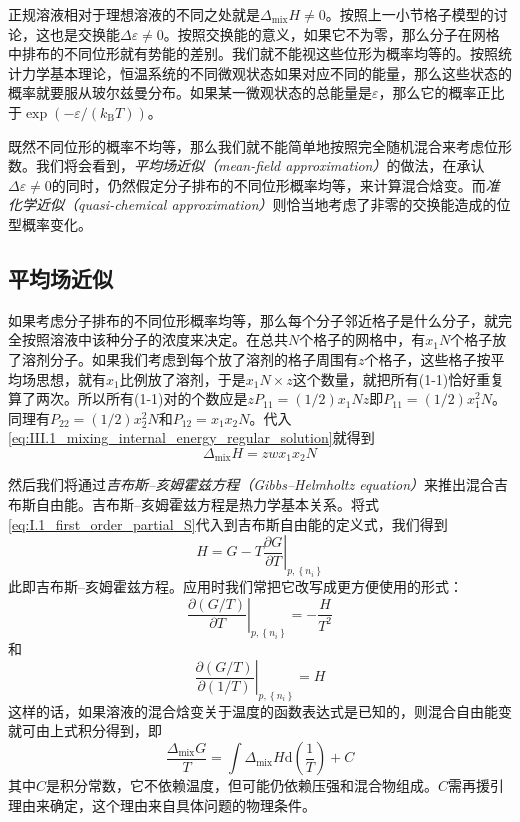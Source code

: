 \documentclass[main.tex]{subfiles}
\begin{document}
正规溶液相对于理想溶液的不同之处就是$\Delta_\text{mix}H\neq 0$。按照上一小节格子模型的讨论，这也是交换能$\Delta\varepsilon\neq 0$。按照交换能的意义，如果它不为零，那么分子在网格中排布的不同位形就有势能的差别。我们就不能视这些位形为概率均等的。按照统计力学基本理论，恒温系统的不同微观状态如果对应不同的能量，那么这些状态的概率就要服从玻尔兹曼分布。如果某一微观状态的总能量是$\varepsilon$，那么它的概率正比于$\exp\left(-\varepsilon/\left(k_\text{B}T\right)\right)$。

既然不同位形的概率不均等，那么我们就不能简单地按照完全随机混合来考虑位形数。我们将会看到，\emph{平均场近似（mean-field approximation）}的做法，在承认$\Delta\varepsilon\neq 0$的同时，仍然假定分子排布的不同位形概率均等，来计算混合焓变。而\emph{准化学近似（quasi-chemical approximation）}则恰当地考虑了非零的交换能造成的位型概率变化。

\subsection{平均场近似}
如果考虑分子排布的不同位形概率均等，那么每个分子邻近格子是什么分子，就完全按照溶液中该种分子的浓度来决定。在总共$N$个格子的网格中，有$x_1N$个格子放了溶剂分子。如果我们考虑到每个放了溶剂的格子周围有$z$个格子，这些格子按平均场思想，就有$x_1$比例放了溶剂，于是$x_1 N\times z$这个数量，就把所有(1-1)恰好重复算了两次。所以所有(1-1)对的个数应是$zP_{11}=(1/2)x_1Nz$即$P_{11}=(1/2)x_1^2N$。同理有$P_{22}=(1/2)x_2^2N$和$P_{12}=x_1x_2N$。代入\eqref{eq:III.1_mixing_internal_energy_regular_solution}就得到
\begin{equation}\label{eq:III.2_mixing_internal_energy_regular_solution_mean_field}
  \Delta_\text{mix}H=zwx_1x_2N
\end{equation}

然后我们将通过\emph{吉布斯--亥姆霍兹方程（Gibbs--Helmholtz equation）}来推出混合吉布斯自由能。吉布斯--亥姆霍兹方程是热力学基本关系。将式\eqref{eq:I.1_first_order_partial_S}代入到吉布斯自由能的定义式，我们得到
\begin{equation}\label{eq:III.2_gibbs_helmholtz_eq}
  H=G-T\left.\frac{\partial G}{\partial T}\right|_{p,\left\{n_i\right\}}
\end{equation}
此即吉布斯--亥姆霍兹方程。应用时我们常把它改写成更方便使用的形式：
\[
  \left.\frac{\partial\left(G/T\right)}{\partial T}\right|_{p,\left\{n_i\right\}}=-\frac{H}{T^2}
\]
和
\[\left.\frac{\partial\left(G/T\right)}{\partial\left(1/T\right)}\right|_{p,\left\{n_i\right\}}=H\]
这样的话，如果溶液的混合焓变关于温度的函数表达式是已知的，则混合自由能变就可由上式积分得到，即
\[\frac{\Delta_\text{mix}G}{T}=\int\Delta_\text{mix}H\mathrm{d}\left(\frac{1}{T}\right)+C\]
其中$C$是积分常数，它不依赖温度，但可能仍依赖压强和混合物组成。$C$需再援引理由来确定，这个理由来自具体问题的物理条件。
\end{document}
